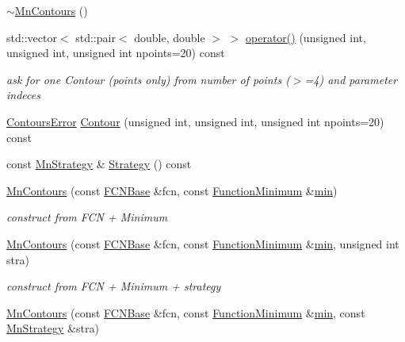 \begin{DoxyCompactItemize}
\mbox{\hyperlink{classROOT_1_1Minuit2_1_1MnContours_a0764759095adb2129ae9282024af472a}{$\sim$\+Mn\+Contours}} ()
\item 
std\+::vector$<$ std\+::pair$<$ double, double $>$ $>$ \mbox{\hyperlink{classROOT_1_1Minuit2_1_1MnContours_a8a56508ee3dd6f22b7378acf8286debe}{operator()}} (unsigned int, unsigned int, unsigned int npoints=20) const
\begin{DoxyCompactList}\small\item\em ask for one Contour (points only) from number of points ($>$=4) and parameter indeces \end{DoxyCompactList}\item 
\mbox{\hyperlink{classROOT_1_1Minuit2_1_1ContoursError}{Contours\+Error}} \mbox{\hyperlink{classROOT_1_1Minuit2_1_1MnContours_a8bcd5be6a72acc39c1b56fd45e9958ba}{Contour}} (unsigned int, unsigned int, unsigned int npoints=20) const
\item 
const \mbox{\hyperlink{classROOT_1_1Minuit2_1_1MnStrategy}{Mn\+Strategy}} \& \mbox{\hyperlink{classROOT_1_1Minuit2_1_1MnContours_a79b55e1c06425b314701c4a3e5b7b009}{Strategy}} () const
\item 
\mbox{\hyperlink{classROOT_1_1Minuit2_1_1MnContours_a87d983509ac3ce6f6635407a81e07153}{Mn\+Contours}} (const \mbox{\hyperlink{classROOT_1_1Minuit2_1_1FCNBase}{F\+C\+N\+Base}} \&fcn, const \mbox{\hyperlink{classROOT_1_1Minuit2_1_1FunctionMinimum}{Function\+Minimum}} \&\mbox{\hyperlink{adat__devel_2lib_2SU3_2SU3__internal_8h_ab0f5fed3171eb00d1c5f037d9f518a23}{min}})
\begin{DoxyCompactList}\small\item\em construct from F\+CN + Minimum \end{DoxyCompactList}\item 
\mbox{\hyperlink{classROOT_1_1Minuit2_1_1MnContours_af56ce1293967140b9ee0ea0b30fad690}{Mn\+Contours}} (const \mbox{\hyperlink{classROOT_1_1Minuit2_1_1FCNBase}{F\+C\+N\+Base}} \&fcn, const \mbox{\hyperlink{classROOT_1_1Minuit2_1_1FunctionMinimum}{Function\+Minimum}} \&\mbox{\hyperlink{adat__devel_2lib_2SU3_2SU3__internal_8h_ab0f5fed3171eb00d1c5f037d9f518a23}{min}}, unsigned int stra)
\begin{DoxyCompactList}\small\item\em construct from F\+CN + Minimum + strategy \end{DoxyCompactList}\item 
\mbox{\hyperlink{classROOT_1_1Minuit2_1_1MnContours_a8f75794bb66e605caabac79cf7a32c77}{Mn\+Contours}} (const \mbox{\hyperlink{classROOT_1_1Minuit2_1_1FCNBase}{F\+C\+N\+Base}} \&fcn, const \mbox{\hyperlink{classROOT_1_1Minuit2_1_1FunctionMinimum}{Function\+Minimum}} \&\mbox{\hyperlink{adat__devel_2lib_2SU3_2SU3__internal_8h_ab0f5fed3171eb00d1c5f037d9f518a23}{min}}, const \mbox{\hyperlink{classROOT_1_1Minuit2_1_1MnStrategy}{Mn\+Strategy}} \&stra)

\end{DoxyCompactItemize}
